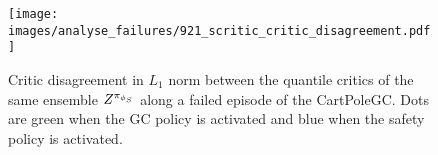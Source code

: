 
\begin{figure}[ht]
    \texttt{[image: images/analyse\_failures/921\_scritic\_critic\_disagreement.pdf]}
    \caption{Critic disagreement in $L_1$ norm between the quantile critics of the 
    same ensemble $Z^{\pi_{\phi_S}}$ along a failed episode of the CartPoleGC.
    Dots are green when the GC policy is activated and blue when the safety policy is activated.}
    \label{fig:analyse_failures/921_scritic_critic_disagreement}
\end{figure}
